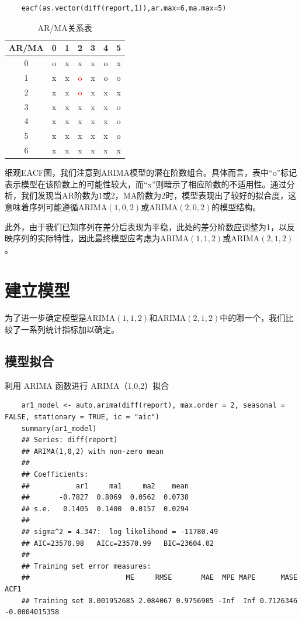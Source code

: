\documentclass{article} %
\begin{document}
\begin{lstlisting}
    eacf(as.vector(diff(report,1)),ar.max=6,ma.max=5)

\end{lstlisting}
\begin{table}[h]
    \centering
    \begin{tabular}{|c|c|c|c|c|c|c|}
    \hline
    AR/MA & 0 & 1 & 2 & 3 & 4 & 5 \\
    \hline
    0 & o & x & x & x & o & x \\
    \hline
    1 & x & x & \cellcolor{yellow}\textcolor{red}{o} & x & o & o \\
    \hline
    2 & x & x & \cellcolor{yellow}\textcolor{red}{o} & x & x & x \\
    \hline
    3 & x & x & x & x & x & o \\
    \hline
    4 & x & x & x & x & x & o \\
    \hline
    5 & x & x & x & x & x & o \\
    \hline
    6 & x & x & x & x & x & x \\
    \hline
    \end{tabular}
    \caption{AR/MA关系表}
    \label{tab:ar-ma-relations}
\end{table}

细观EACF图，我们注意到ARIMA模型的潜在阶数组合。具体而言，表中“o”标记表示模型在该阶数上的可能性较大，而“x”则暗示了相应阶数的不适用性。通过分析，我们发现当AR阶数为1或2，MA阶数为2时，模型表现出了较好的拟合度，这意味着序列可能遵循\(\text{ARIMA}(1,0,2)\)或\(\text{ARIMA}(2,0,2)\)的模型结构。

此外，由于我们已知序列在差分后表现为平稳，此处的差分阶数应调整为1，以反映序列的实际特性，因此最终模型应考虑为\(\text{ARIMA}(1,1,2)\)或\(\text{ARIMA}(2,1,2)\)。

\section{建立模型}

为了进一步确定模型是\(\text{ARIMA}(1,1,2)\)和\(\text{ARIMA}(2,1,2)\)中的哪一个，我们比较了一系列统计指标加以确定。

\subsection{模型拟合}

利用 ARIMA 函数进行 ARIMA（1,0,2）拟合
\begin{lstlisting}
    ar1_model <- auto.arima(diff(report), max.order = 2, seasonal = FALSE, stationary = TRUE, ic = "aic")
    summary(ar1_model)
    ## Series: diff(report) 
    ## ARIMA(1,0,2) with non-zero mean 
    ## 
    ## Coefficients:
    ##           ar1     ma1     ma2    mean
    ##       -0.7827  0.8069  0.0562  0.0738
    ## s.e.   0.1405  0.1400  0.0157  0.0294
    ## 
    ## sigma^2 = 4.347:  log likelihood = -11780.49
    ## AIC=23570.98   AICc=23570.99   BIC=23604.02
    ## 
    ## Training set error measures:
    ##                       ME     RMSE       MAE  MPE MAPE      MASE          ACF1
    ## Training set 0.001952685 2.084067 0.9756905 -Inf  Inf 0.7126346 -0.0004015358
\end{lstlisting}
\end{document}
